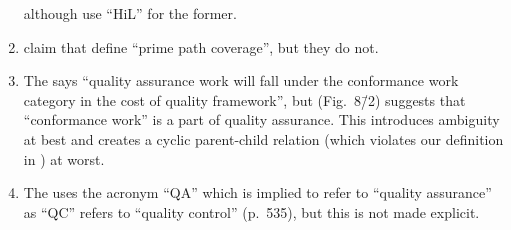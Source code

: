 \begin{enumerate}
          although \citet[p.~2]{PreußeEtAl2012} use ``HiL'' for the former.
    \item %
          \citet[p.~184]{DoğanEtAl2014} claim that \citet{SakamotoEtAl2013}
          define ``prime path coverage'', but they do not.
    \item %
          The \citet[p.~244; similar on p.~535]{PMBOK2013} says ``quality
          assurance work will fall under the conformance work category in the
          cost of quality framework'', but (Fig.~8\=/2) suggests that
          ``conformance work'' is a part of quality assurance. This
          introduces ambiguity at best and creates a cyclic parent-child
          relation (which violates our definition in %
          ) at worst.
    \item %
          The \citet[p.~476]{PMBOK2013} uses the acronym ``QA'' which is
          implied to refer to ``quality assurance'' as ``QC'' refers to
          ``quality control'' (p.~535), but this is not made explicit.


\end{enumerate}
